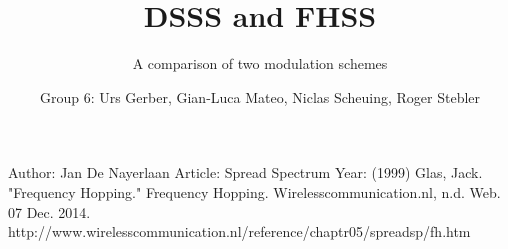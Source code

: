 \documentclass{llncs}
\begin{document}
\title{DSSS and FHSS}


\subtitle{A comparison of two modulation schemes}


\author{Group 6: Urs Gerber, Gian-Luca Mateo, Niclas Scheuing, Roger Stebler} 







\maketitle










%
%

\begin{thebibliography}{1}
Author: Jan De Nayerlaan
Article: Spread Spectrum
Year: (1999) 
Glas, Jack. "Frequency Hopping." Frequency Hopping. Wirelesscommunication.nl, n.d. Web. 07 Dec. 2014. http://www.wirelesscommunication.nl/reference/chaptr05/spreadsp/fh.htm
\end{thebibliography}
\end{document}
